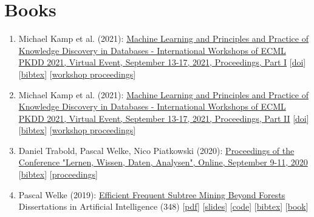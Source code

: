\documentclass{scrartcl}
\begin{document}
\section{Books}
\begin{enumerate}
\conti
\item
\label{ecml2021workshop1}
Michael Kamp et al. (2021):\newline
\href{https://dx.doi.org/10.1007/978-3-030-93736-2}{Machine Learning and Principles and Practice of Knowledge Discovery
in Databases - International Workshops of ECML PKDD 2021, Virtual
Event, September 13-17, 2021, Proceedings, Part I}\newline
{\footnotesize
[\href{https://dx.doi.org/10.1007/978-3-030-93736-2}{doi}]
[\href{https://dblp.org/rec/conf/pkdd/2021-w1.bib}{bibtex}]
[\href{https://pwelke.github.io/}{workshop proceedings}]
}
\item
\label{ecml2021workshop2}
Michael Kamp et al. (2021):\newline
\href{https://dx.doi.org/10.1007/978-3-030-93733-1}{Machine Learning and Principles and Practice of Knowledge Discovery
in Databases - International Workshops of ECML PKDD 2021, Virtual
Event, September 13-17, 2021, Proceedings, Part II}\newline
{\footnotesize
[\href{https://dx.doi.org/10.1007/978-3-030-93733-1}{doi}]
[\href{https://dblp.org/rec/conf/pkdd/2021-w2.bib}{bibtex}]
[\href{https://pwelke.github.io/}{workshop proceedings}]
}
\item
\label{lwda2020proceedings}
Daniel Trabold, Pascal Welke, Nico Piatkowski (2020):\newline
\href{https://ceur-ws.org/Vol-2738}{Proceedings of the Conference "Lernen, Wissen, Daten, Analysen", Online,
September 9-11, 2020}\newline
{\footnotesize
[\href{https://dblp.org/rec/conf/lwa/2020.bib}{bibtex}]
[\href{https://ceur-ws.org/Vol-2738}{proceedings}]
}
\item
\label{welke2019diss}
Pascal Welke (2019):\newline
\href{https://pwelke.github.io/http://hss.ulb.uni-bonn.de/2019/5401/5401.htm}{Efficient Frequent Subtree Mining Beyond Forests}\newline
Dissertations in Artificial Intelligence (348)\newline
{\footnotesize
[\href{https://bonndoc.ulb.uni-bonn.de/xmlui/bitstream/handle/20.500.11811/7893/5401.pdf}{pdf}]
[\href{https://pwelke.github.io/publications/welke2019diss-slides.pdf}{slides}]
[\href{https://github.com/pwelke/GraphMiningTools}{code}]
[\href{https://dblp.org/rec/phd/dnb/Welke19.bib}{bibtex}]
[\href{https://www.iospress.nl/book/efficient-frequent-subtree-mining-beyond-forests/}{book}]
}
\seti
\end{enumerate}
\end{document}
